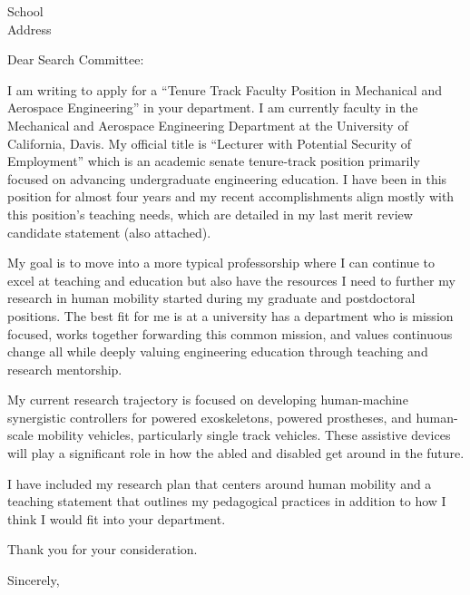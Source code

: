 \documentclass{letter}
\date{}
\begin{document}
\begin{letter}{
  School \\
  Address
}

\opening{Dear Search Committee:}

I am writing to apply for a ``Tenure Track Faculty Position in Mechanical and
Aerospace Engineering'' in your department. I am currently faculty in the
Mechanical and Aerospace Engineering Department at the University of
California, Davis. My official title is ``Lecturer with Potential Security of
Employment'' which is an academic senate tenure-track position primarily
focused on advancing undergraduate engineering education. I have been in this
position for almost four years and my recent accomplishments align mostly with
this position's teaching needs, which are detailed in my last merit review
candidate statement (also attached).

My goal is to move into a more typical professorship where I can continue to
excel at teaching and education but also have the resources I need to further
my research in human mobility started during my graduate and postdoctoral
positions. The best fit for me is at a university has a department who is
mission focused, works together forwarding this common mission, and values
continuous change all while deeply valuing engineering education through
teaching and research mentorship.

My current research trajectory is focused on developing human-machine
synergistic controllers for powered exoskeletons, powered prostheses, and
human-scale mobility vehicles, particularly single track vehicles. These
assistive devices will play a significant role in how the abled and disabled
get around in the future.

I have included my research plan that centers around human mobility and a
teaching statement that outlines my pedagogical practices in addition to how I
think I would fit into your department.

Thank you for your consideration.

\closing{Sincerely,}

\end{letter}
\end{document}
